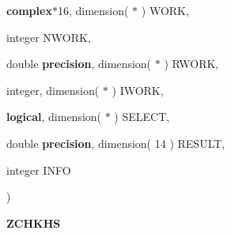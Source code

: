 {\begin{DoxyParamCaption}
\item[{{\bf complex}$\ast$16, dimension( $\ast$ )}]{W\+O\+R\+K, }
\item[{integer}]{N\+W\+O\+R\+K, }
\item[{double {\bf precision}, dimension( $\ast$ )}]{R\+W\+O\+R\+K, }
\item[{integer, dimension( $\ast$ )}]{I\+W\+O\+R\+K, }
\item[{{\bf logical}, dimension( $\ast$ )}]{S\+E\+L\+E\+C\+T, }
\item[{double {\bf precision}, dimension( 14 )}]{R\+E\+S\+U\+L\+T, }
\item[{integer}]{I\+N\+F\+O}
\end{DoxyParamCaption}
)}\label{group__complex16__eig_ga427e9c206762384bc4e7b5bc787e6073}


{\bfseries Z\+C\+H\+K\+H\+S} 

